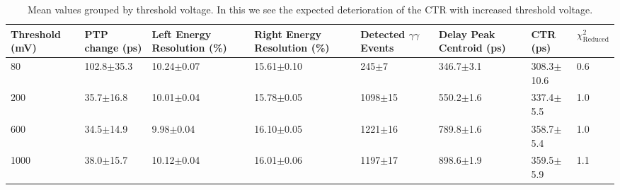 \begin{table}
\caption{\label{tab:thresholdtest} Mean values grouped by threshold voltage. In this we see the expected deterioration of the CTR with increased threshold voltage.}
\begin{tabular}{llllllll}
\hline
Threshold (mV) & PTP change (ps) & Left Energy Resolution (\%) & Right Energy Resolution (\%) & Detected $\gamma\gamma$ Events & Delay Peak Centroid (ps)  & CTR (ps) &  $\chi^2_\text{Reduced}$ \\
\hline
   80        &  102.8$\pm$35.3 &  10.24$\pm$0.07 &  15.61$\pm$0.10 &    245$\pm$7 &  346.7$\pm$3.1 &  308.3$\pm$10.6 &        0.6 \\
   200       &   35.7$\pm$16.8 &  10.01$\pm$0.04 &  15.78$\pm$0.05 &  1098$\pm$15 &  550.2$\pm$1.6 &   337.4$\pm$5.5 &        1.0 \\
   600       &   34.5$\pm$14.9 &   9.98$\pm$0.04 &  16.10$\pm$0.05 &  1221$\pm$16 &  789.8$\pm$1.6 &   358.7$\pm$5.4 &        1.0 \\
   1000      &   38.0$\pm$15.7 &  10.12$\pm$0.04 &  16.01$\pm$0.06 &  1197$\pm$17 &  898.6$\pm$1.9 &   359.5$\pm$5.9 &        1.1 \\
\hline
\end{tabular}
\end{table}


